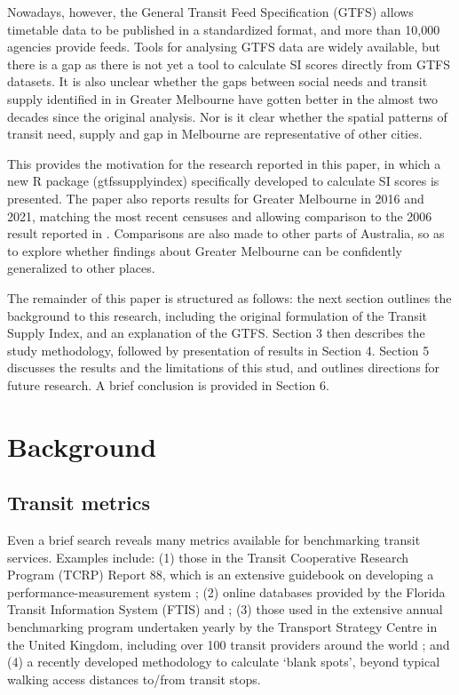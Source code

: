 \documentclass[preprint, 3p,
authoryear]{elsarticle} %
\begin{document}
Nowadays, however, the General Transit Feed Specification (GTFS) allows
timetable data to be published in a standardized format, and more than
10,000 agencies provide feeds\citep{GTFS}. Tools for analysing GTFS data
are widely available, but there is a gap as there is not yet a tool to
calculate SI scores directly from GTFS datasets. It is also unclear
whether the gaps between social needs and transit supply identified in
\citet{currie2010identifying} in Greater Melbourne have gotten better in
the almost two decades since the original analysis. Nor is it clear
whether the spatial patterns of transit need, supply and gap in
Melbourne are representative of other cities.

This provides the motivation for the research reported in this paper, in
which a new R package (gtfssupplyindex) specifically developed to
calculate SI scores is presented. The paper also reports results for
Greater Melbourne in 2016 and 2021, matching the most recent censuses
and allowing comparison to the 2006 result reported in
\citet{currie2010identifying}. Comparisons are also made to other parts
of Australia, so as to explore whether findings about Greater Melbourne
can be confidently generalized to other places.

The remainder of this paper is structured as follows: the next section
outlines the background to this research, including the original
formulation of the Transit Supply Index, and an explanation of the GTFS.
Section 3 then describes the study methodology, followed by presentation
of results in Section 4. Section 5 discusses the results and the
limitations of this stud, and outlines directions for future research. A
brief conclusion is provided in Section 6.

\hypertarget{background}{%
\section{Background}\label{background}}

\hypertarget{transit-metrics}{%
\subsection{Transit metrics}\label{transit-metrics}}

Even a brief search reveals many metrics available for benchmarking
transit services. Examples include: (1) those in the Transit Cooperative
Research Program (TCRP) Report 88, which is an extensive guidebook on
developing a performance-measurement system \citep{Ryus:2003aa}; (2)
online databases provided by the Florida Transit Information System
(FTIS) \citep{Florida-Transit-Information-System:2018aa} and
\citet{UITP:2015aa}; (3) those used in the extensive annual benchmarking
program undertaken yearly by the Transport Strategy Centre in the United
Kingdom, including over 100 transit providers around the world
\citep{Imperial-College-London:2023aa}; and (4) a recently developed
methodology to calculate `blank spots', beyond typical walking access
distances to/from transit stops\citep{AlamriSultan2023GAoA}.
\end{document}
